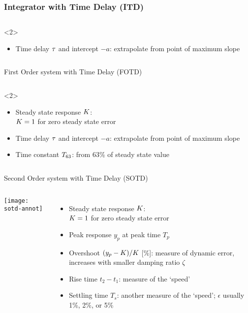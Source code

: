 \documentclass{beamer-control}
\begin{document}
\begin{frame}
\frametitle{Integrator with Time Delay (ITD)}
\begin{columns}
%
%

\scriptsize
\begin{uncoverenv}<2>
\begin{itemize}
\item Time delay $\tau$ and intercept $-a$: extrapolate from point of maximum slope
\end{itemize}
\end{uncoverenv}
\end{columns}
\end{frame}

\begin{frame}{First Order system with Time Delay (FOTD)}
\begin{columns}
%
%

\scriptsize
\begin{uncoverenv}<2>
\begin{itemize}
\item Steady state response $K$:\\ $K=1$ for zero steady state error
\item Time delay $\tau$ and intercept $-a$: extrapolate from point of maximum slope
\item Time constant $T_{63}$: from 63\% of steady state value
\end{itemize}
\end{uncoverenv}
\end{columns}
\end{frame}


\begin{frame}{Second Order system with Time Delay (SOTD)}
\begin{columns}
\texttt{[image: sotd-annot]}

\scriptsize
\begin{itemize}
\item Steady state response $K$:\\ $K=1$ for zero steady state error
\item Peak response $y_p$ at peak time $T_p$
\item Overshoot $(y_p-K)/K$ [\%]: measure of dynamic error, increases with smaller damping ratio $\zeta$
\item Rise time $t_2-t_1$: measure of the `speed'
\item Settling time $T_s$: another measure of the `speed'; $\epsilon$ usually 1\%, 2\%, or 5\%
\end{itemize}
\end{columns}
\end{frame}
\end{document}
